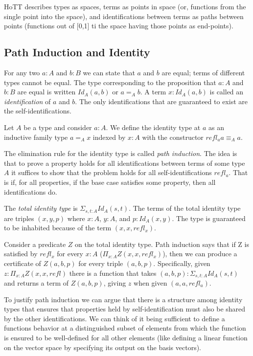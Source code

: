 \documentclass{article}
\begin{document}
HoTT describes types as spaces, terms as points in space (or, functions from the single point into the space), and identifications between terms as paths between points (functions out of [0,1] ti the space having those points as end-points).

\subsection{Path Induction and Identity}

For any two $a : A$ and $b : B$ we can state that $a$ and $b$ are equal; terms of different types cannot be equal. The type corresponding to the proposition that $a : A$ and $b : B$ are equal is written $Id_{A}(a, b)$ or $a =_{A} b$. A term $x : Id_{A}(a, b)$ is called an \emph{identification} of $a$ and $b$. The only identifications that are guaranteed to exist are the self-identifications.

\begin{definition}\label{dfn: identity-type}
  Let $A$ be a type and consider $a : A$. We define the identity type at $a$ as an inductive family type $a =_{A} x$ indexed by $x : A$ with the constructor $refl_{a} a \equiv_{A} a$.
\end{definition}

The elimination rule for the identity type is called \emph{path induction}. The idea is that to prove a property holds for all identifications between terms of some type $A$ it suffices to show that the problem holds for all self-identifications $refl_{a}$. That is if, for all properties, if the base case satisfies some property, then all identifications do.

The \emph{total identity type} is $\Sigma_{s, t : A} Id_{A}(s, t)$. The terms of the total identity type are triples $(x, y, p)$ where $x : A$, $y : A$, and $p : Id_{A}(x, y)$. The type is guaranteed to be inhabited because of the term $(x, x, refl_{x})$.

Consider a predicate $Z$ on the total identity type. Path induction says that if Z is satisfied by $refl_{x}$ for every $x : A$ ($\Pi_{x : A} Z(x,x,refl_{x})$), then we can produce a certificate of $Z(a, b, p)$ for every triple $(a, b, p)$. Specifically, given $z : \Pi_{x : A} Z(x, x, refl)$ there is a function that takes $(a, b, p) : \Sigma_{s, t : A} Id_{A}(s, t)$ and returns a term of $Z(a, b, p)$, giving $z$ when given $(a, a, refl_{a})$.

To justify path induction we can argue that there is a structure among identity types that ensures that properties held by self-identification must also be shared by the other identifications. We can think of it being sufficient to define a functions behavior at a distinguished subset of elements from which the function is ensured to be well-defined for all other elements (like defining a linear function on the vector space by specifying its output on the basis vectors).
\end{document}
